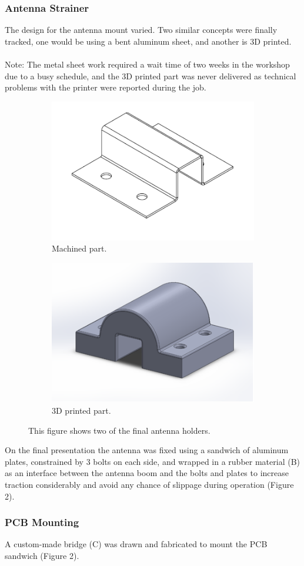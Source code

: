 \subsubsection*{Antenna Strainer}
The design for the antenna mount varied. Two similar concepts were finally tracked, one would be using a bent aluminum sheet, and another is 3D printed.\\
\\
Note: The metal sheet work required a wait time of two weeks in the workshop due to a busy schedule, and the 3D printed part was never delivered as technical problems with the printer were reported during the job.
\begin{figure}[H]
\centering
\begin{subfigure}{.5\textwidth}
  \centering
  \includegraphics[width=.85\linewidth]{../art/Strain1.png}
  \caption{Machined part.}
  \label{fig:sub1}
\end{subfigure}%
\begin{subfigure}{.5\textwidth}
  \centering
  \includegraphics[width=.85\linewidth]{../art/Strain2.png}
  \caption{3D printed part.}
  \label{fig:sub2}
\end{subfigure}
\caption{This figure shows two of the final antenna holders.}
\label{fig:test}
\end{figure}
On the final presentation the antenna was fixed using a sandwich of aluminum plates, constrained by 3 bolts on each side, and wrapped in a rubber material (B) as an interface between the antenna boom and the bolts and plates to increase traction considerably and avoid any chance of slippage during operation (Figure 2).

\subsubsection*{PCB Mounting}
A custom-made bridge (C) was drawn and fabricated to mount the PCB sandwich (Figure 2).
